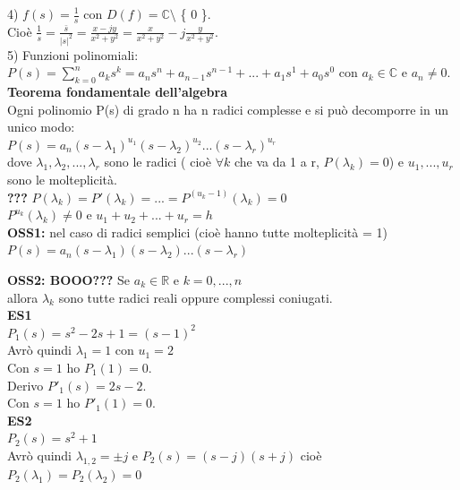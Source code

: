 4) $ f(s) = \frac{1}{s}$ con $ D(f) = \mathbb{C} \setminus$ \{ 0 \}.\\
Cioè $ \frac{1}{s} = \frac{ \bar{s} }{ |s|^{2}} = \frac{x-jy}{x^{2} + y^{2}} = \frac{ x }{ x^{2} + y^{2} } - j \frac{ y }{ x^{2} + y^{2} } $.\\

5) Funzioni polinomiali:\\
$ P(s) = \sum_{k=0}^n a_{k} s^{k} = a_{n} s^{n} + a_{n-1} s^{n-1} +...+a_{1} s^{1}+a_{0} s^{0} $ con $ a_{k} \in \mathbb{C} $ e $ a_{n} \neq 0$. \\

\textbf{Teorema fondamentale dell'algebra}\\
Ogni polinomio P(s) di grado n ha n radici complesse e si può decomporre in un unico modo:\\
$ P(s) = a_{n} (s- \lambda_{1})^{u_{1}} (s- \lambda_{2})^{u_{2}} ... (s- \lambda_{r})^{u_{r}} $ \\
dove $ \lambda_{1}, \lambda_{2},...,\lambda_{r} $ sono le radici ( cioè $ \forall k $ che va da 1 a r, $ P(\lambda_{k}) = 0$) e $ u_{1},...,u_{r} $ sono le molteplicità.\\

\textbf{???}%
$ P(\lambda_{k}) = P'(\lambda_{k}) = ... = P^{(u_{k}-1)}(\lambda_{k}) = 0 $ \\
$ P^{u_{k}}(\lambda_{k}) \neq 0 $ e $ u_{1}+u_{2}+...+u_{r} = h $\\

\textbf{OSS1:} nel caso di radici semplici (cioè hanno tutte molteplicità = 1)\\
$ P(s) = a_{n} (s- \lambda_{1}) (s- \lambda_{2}) ... (s- \lambda_{r}) $

\textbf{OSS2: BOOO???} Se $ a_{k} \in \mathbb{R}$ e $ k=0,...,n $ \\
allora $ \lambda_{k}$ sono tutte radici reali oppure complessi coniugati.\\

\textbf{ES1}\\
$ P_{1}(s) = s^{2} -2s +1 = (s-1)^{2}$\\
Avrò quindi $ \lambda_{1} = 1$ con $ u_{1} = 2$\\
Con $ s=1 $ ho $ P_{1}(1) = 0$.\\
Derivo $ P'_{1}(s) = 2s - 2$.\\
Con $ s=1 $ ho $ P'_{1}(1) = 0$.\\

\textbf{ES2}\\
$ P_{2}(s) = s^{2} +1$\\
Avrò quindi $ \lambda_{1,2} = \pm j$ e $ P_{2}(s) = (s-j)(s+j)$ cioè $ P_{2}( \lambda_{1})=P_{2}( \lambda_{2})=0$\\

